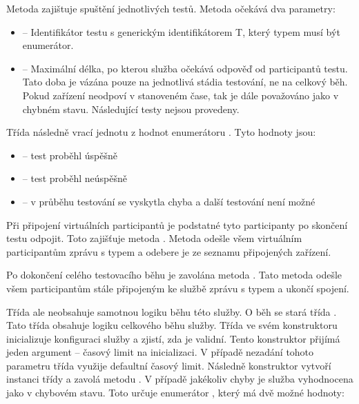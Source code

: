 Metoda  zajištuje spuštění jednotlivých testů. Metoda očekává dva parametry:

\begin{itemize}
    \item {} -- Identifikátor testu s generickým identifikátorem T, který typem musí být enumerátor.
    \item {} -- Maximální délka, po kterou služba očekává odpověď od participantů testu. Tato doba je vázána pouze na jednotlivá stádia testování, ne na celkový běh. Pokud zařízení neodpoví v stanoveném čase, tak je dále považováno jako v chybném stavu. Následující testy nejsou provedeny.
\end{itemize}

Třída následně vrací jednotu z hodnot enumerátoru . Tyto hodnoty jsou:

\begin{itemize}
    \item {} -- test proběhl úspěšně
    \item {} -- test proběhl neúspěšně
    \item {} -- v průběhu testování se vyskytla chyba a další testování není možné   
\end{itemize}

Při připojení virtuálních participantů je podstatné tyto participanty po skončení testu odpojit. Toto zajišťuje metoda . Metoda odešle všem virtuálním participantům zprávu s typem  a odebere je ze seznamu připojených zařízení.

Po dokončení celého testovacího běhu je zavolána metoda . Tato metoda odešle všem participantům stále připojeným ke službě zprávu s typem  a ukončí spojení.

Třída  ale neobsahuje samotnou logiku běhu této služby. O běh se stará třída . Tato třída obsahuje logiku celkového běhu služby. Třída ve svém konstruktoru inicializuje konfiguraci služby a zjistí, zda je validní. Tento konstruktor přijímá jeden argument -- časový limit na inicializaci. V případě nezadání tohoto parametru třída využije defaultní časový limit. Následně konstruktor vytvoří instanci třídy  a zavolá metodu . V případě jakékoliv chyby je služba vyhodnocena jako v chybovém stavu. Toto určuje enumerátor , který má dvě možné hodnoty: 

